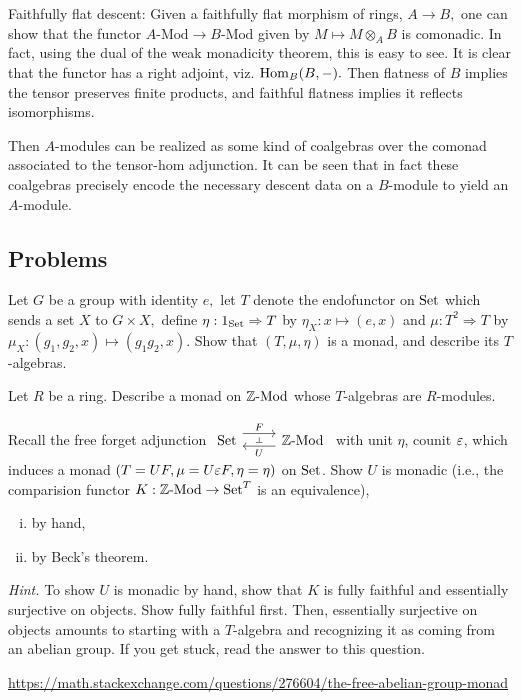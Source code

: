 \documentclass[12pt]{article}
\newcommand{\LMod}{\text{-}\mathrm{Mod}}
\begin{document}
\begin{eg}
    Faithfully flat descent: Given a faithfully flat morphism of rings, $A\to B,$ one can show that the functor $A\LMod \to B\LMod$ given by $M\mapsto M\otimes_AB$ is comonadic. In fact, using the dual of the weak monadicity theorem, this is easy to see. It is clear that the functor has a right adjoint, viz. $\mathrm{Hom}_B(B,-).$ Then flatness of $B$ implies the tensor preserves finite products, and faithful flatness implies it reflects isomorphisms.
    
    Then $A$-modules can be realized as some kind of coalgebras over the comonad associated to the tensor-hom adjunction. It can be seen that in fact these coalgebras precisely encode the necessary descent data on a $B$-module to yield an $A$-module.
\end{eg}


\newpage
\subsection{Problems}

\begin{problem}
    Let $G$ be a group with identity $e,$ let $T$ denote the endofunctor on $\mathrm{Set}$ which sends a set $X$ to $G\times X,$ define $\eta:1_{\mathrm{Set}}\Rightarrow T$ by $\eta_X:x\mapsto (e,x)$ and $\mu:T^2\Rightarrow T$ by $\mu_X:(g_1,g_2,x)\mapsto(g_1g_2,x).$ Show that $(T,\mu,\eta)$ is a monad, and describe its $T$-algebras.
\end{problem}
\bigskip

\begin{problem}
    Let $R$ be a ring. Describe a monad on $\Z\LMod$ whose $T$-algebras are $R$-modules.
\end{problem}
\bigskip

\begin{problem}\label{free-forget-problem}
    Recall the free forget adjunction $\adjunction{\Set}{\Z\LMod}{F}{U}$ with unit $\eta$, counit $\varepsilon$, which induces a monad $(T=UF, \mu=U\varepsilon F, \eta=\eta)$ on $\mathrm{Set}$. Show $U$ is monadic (i.e., the comparision functor $K:\Z\LMod \to \Set^T$ is an equivalence),
    \begin{enumerate}[(i)]
        \item by hand,
        \item by Beck's theorem.
    \end{enumerate}

    \textit{Hint.} To show $U$ is monadic by hand, show that $K$ is fully faithful and essentially surjective on objects. Show fully faithful first. Then, essentially surjective on objects amounts to starting with a $T$-algebra and recognizing it as coming from an abelian group. If you get stuck, read the answer to this question.
    
    \url{https://math.stackexchange.com/questions/276604/the-free-abelian-group-monad}
\end{problem}
\bigskip
\end{document}

